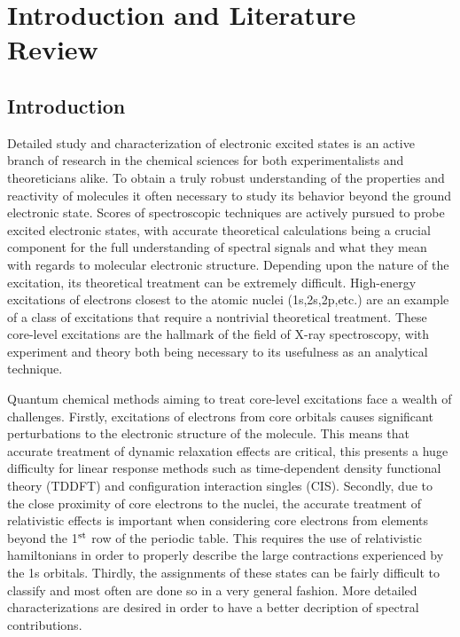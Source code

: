 \documentclass[final]{emory}
\begin{document}
\maketoc

\chapter{Introduction and Literature Review}
\section{Introduction}
Detailed study and characterization of electronic excited states is an active branch of research in the chemical sciences for both experimentalists and theoreticians alike. To obtain a truly robust understanding of the properties and reactivity of molecules it often necessary to study its behavior beyond the ground electronic state. Scores of spectroscopic techniques are actively pursued to probe excited electronic states, with accurate theoretical calculations being a crucial component for the full understanding of spectral signals and what they mean with regards to molecular electronic structure. Depending upon the nature of the excitation, its theoretical treatment can be extremely difficult. High-energy excitations of electrons closest to the atomic nuclei (1s,2s,2p,etc.) are an example of a class of excitations that require a nontrivial theoretical treatment. These core-level excitations are the hallmark of the field of X-ray spectroscopy, with experiment and theory both being necessary to its usefulness as an analytical technique. 

Quantum chemical methods aiming to treat core-level excitations face a wealth of challenges. Firstly, excitations of electrons from core orbitals causes significant perturbations to the electronic structure of the molecule. This means that accurate treatment of dynamic relaxation effects are critical, this presents a huge difficulty for linear response methods such as time-dependent density functional theory (TDDFT) and configuration interaction singles (CIS). Secondly, due to the close proximity of core electrons to the nuclei, the accurate treatment of relativistic effects is important when considering core electrons from elements beyond the 1$^{\rm st}$ row of the periodic table. This requires the use of relativistic hamiltonians in order to properly describe the large contractions experienced by the 1s orbitals. Thirdly, the assignments of these states can be fairly difficult to classify and most often are done so in a very general fashion. More detailed characterizations are desired in order to have a better decription of spectral contributions. 
\end{document}
